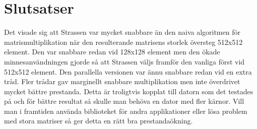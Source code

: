 \section{Slutsatser}
Det visade sig att Strassen var mycket snabbare än den naiva algoritmen för matrismultiplikation när den resulterande matrisens storlek översteg 512x512 element. Den var snabbare redan vid 128x128 element men den ökade minnesanvändningen gjorde så att Strassen väljs framför den vanliga först vid 512x512 element. Den parallella versionen var ännu snabbare redan vid en extra tråd. Fler trådar gav marginellt snabbare multiplikation men inte överdrivet mycket bättre prestanda. Detta är troligtvis kopplat till datorn som det testades på och för bättre resultat så skulle man behöva en dator med fler kärnor. Vill man i framtiden använda biblioteket för andra applikationer eller lösa problem med stora matriser så ger detta en rätt bra prestandaökning. 